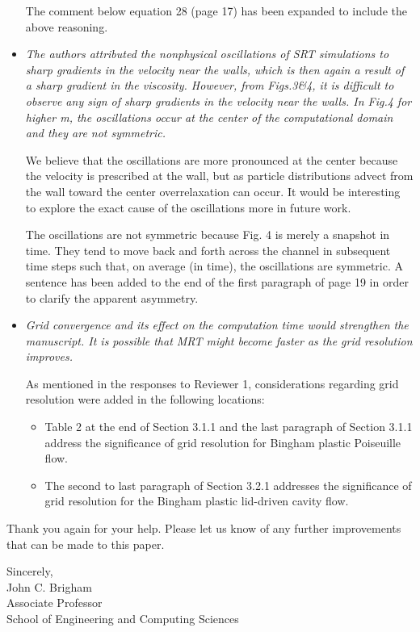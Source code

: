 \documentclass{article}
\begin{document}
\begin{itemize}
	The comment below equation 28 (page 17) has been expanded to include the above reasoning.
	
	\item \emph{The authors attributed the nonphysical oscillations of SRT simulations to sharp gradients in the velocity near the walls, which is then again a result of a sharp gradient in the viscosity. However, from Figs.3\&4, it is difficult to observe any sign of sharp gradients in the velocity near the walls. In Fig.4 for higher m, the oscillations occur at the center of the computational domain and they are not symmetric.}
	
	We believe that the oscillations are more pronounced at the center because the velocity is prescribed at the wall, but as particle distributions advect from the wall toward the center overrelaxation can occur. It would be interesting to explore the exact cause of the oscillations more in future work.
	
	The oscillations are not symmetric because Fig. 4 is merely a snapshot in time. They tend to move back and forth across the channel in subsequent time steps such that, on average (in time), the oscillations are symmetric. A sentence has been added to the end of the first paragraph of page 19 in order to clarify the apparent asymmetry.
	
	\item \emph{Grid convergence and its effect on the computation time would strengthen the manuscript. It is possible that MRT might become faster as the grid resolution improves.}
	
	As mentioned in the responses to Reviewer 1, considerations regarding grid resolution were added in the following locations:
	\begin{itemize}
		\item Table 2 at the end of Section 3.1.1 and the last paragraph of Section 3.1.1 address the significance of grid resolution for Bingham plastic Poiseuille flow.
		\item The second to last paragraph of Section 3.2.1 addresses the significance of grid resolution for the Bingham plastic lid-driven cavity flow.
	\end{itemize}
	
	\end{itemize}

Thank you again for your help. Please let us know of any further improvements that can be made to this paper.

\vspace{1in}
\noindent Sincerely, \\
\indent John C. Brigham \\
\indent Associate Professor \\
\indent School of Engineering and Computing Sciences
	
\end{document}
